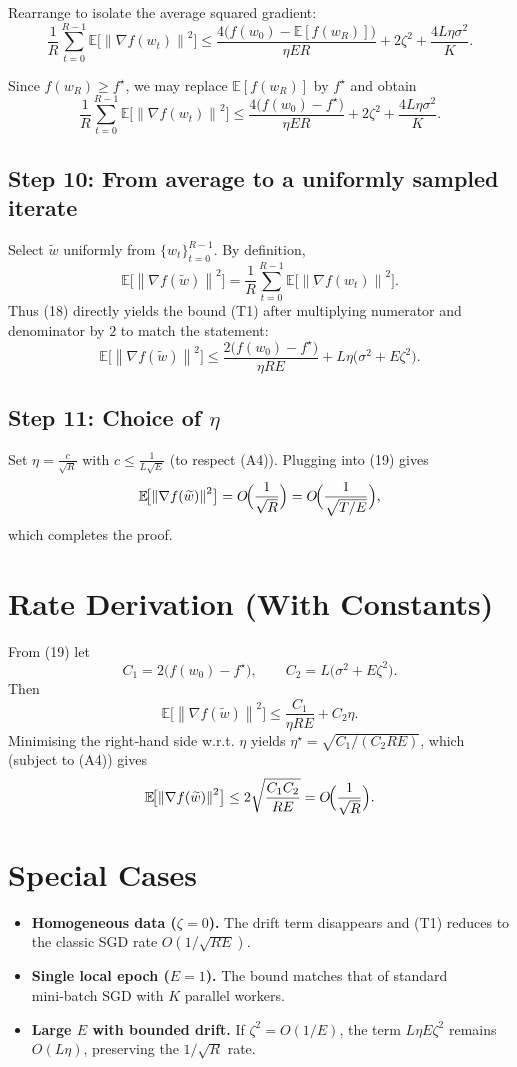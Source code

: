 \documentclass{article}
\newcommand{\EE}{\mathbb{E}}
\newcommand{\norm}[1]{\left\lVert#1\right\rVert}
\begin{document}
Rearrange to isolate the average squared gradient:
\[
\frac{1}{R}\sum_{t=0}^{R-1}\EE\!\bigl[\norm{\nabla f(w_t)}^{2}\bigr]
\le
\frac{4\bigl(f(w_0)-\EE[f(w_R)]\bigr)}{\eta E R}
+ 2\zeta^{2}
+ \frac{4L\eta\sigma^{2}}{K}.
\tag{17}
\]

Since $f(w_R)\ge f^\star$, we may replace $\EE[f(w_R)]$ by $f^\star$ and obtain
\[
\frac{1}{R}\sum_{t=0}^{R-1}\EE\!\bigl[\norm{\nabla f(w_t)}^{2}\bigr]
\le
\frac{4\bigl(f(w_0)-f^\star\bigr)}{\eta E R}
+ 2\zeta^{2}
+ \frac{4L\eta\sigma^{2}}{K}.
\tag{18}
\]

\subsection*{Step 10: From average to a uniformly sampled iterate}
Select $\widetilde w$ uniformly from $\{w_t\}_{t=0}^{R-1}$. By definition,
\[
\EE\!\bigl[\norm{\nabla f(\widetilde w)}^{2}\bigr]
= \frac{1}{R}\sum_{t=0}^{R-1}\EE\!\bigl[\norm{\nabla f(w_t)}^{2}\bigr].
\]
Thus (18) directly yields the bound (T1) after multiplying numerator and denominator by $2$ to match the statement:
\[
\EE\!\bigl[\norm{\nabla f(\widetilde w)}^{2}\bigr]
\le
\frac{2\bigl(f(w_0)-f^\star\bigr)}{\eta RE}
+ L\eta\bigl(\sigma^{2}+E\zeta^{2}\bigr).
\tag{19}
\]

\subsection*{Step 11: Choice of $\eta$}
Set $\eta = \frac{c}{\sqrt{R}}$ with $c\le \frac{1}{L\sqrt{E}}$ (to respect (A4)).  
Plugging into (19) gives
\[
\EE\!\bigl[\norm{\nabla f(\widetilde w)}^{2}\bigr]
= O\!\Bigl(\frac{1}{\sqrt{R}}\Bigr)
= O\!\Bigl(\frac{1}{\sqrt{T/E}}\Bigr),
\]
which completes the proof. \qedhere

\section*{Rate Derivation (With Constants)}
From (19) let
\[
C_1 = 2\bigl(f(w_0)-f^\star\bigr),\qquad
C_2 = L\bigl(\sigma^{2}+E\zeta^{2}\bigr).
\]
Then
\[
\EE\!\bigl[\norm{\nabla f(\widetilde w)}^{2}\bigr]
\le \frac{C_1}{\eta RE}+C_2\eta .
\]
Minimising the right‑hand side w.r.t. $\eta$ yields $\eta^\star=\sqrt{C_1/(C_2 RE)}$, which (subject to (A4)) gives
\[
\EE\!\bigl[\norm{\nabla f(\widetilde w)}^{2}\bigr]\le
2\sqrt{\frac{C_1 C_2}{RE}} = O\!\Bigl(\frac{1}{\sqrt{R}}\Bigr).
\]

\section*{Special Cases}
\begin{itemize}
\item \textbf{Homogeneous data ($\zeta=0$).} The drift term disappears and (T1) reduces to the classic SGD rate $O(1/\sqrt{RE})$.
\item \textbf{Single local epoch ($E=1$).} The bound matches that of standard mini‑batch SGD with $K$ parallel workers.
\item \textbf{Large $E$ with bounded drift.} If $\zeta^{2}=O(1/E)$, the term $L\eta E\zeta^{2}$ remains $O(L\eta)$, preserving the $1/\sqrt{R}$ rate.
\end{itemize}
\end{document}
